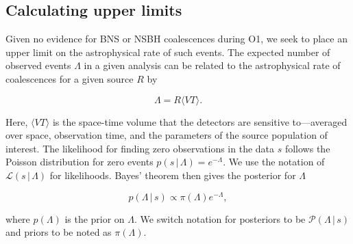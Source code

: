 \subsection{Calculating upper limits}
\label{ssec:upper_limits}

Given no evidence for \ac{BNS} or \ac{NSBH} coalescences during \ac{O1}, we seek to place an upper limit
on the astrophysical rate of such events.
The expected number of observed events $\Lambda$ in a given analysis can be
related to the astrophysical rate of coalescences for a given source $R$ by
%
\begin{linenomath*}
\begin{equation}
    \Lambda = R { \langle VT \rangle}.
\end{equation}
\end{linenomath*}
%
Here, $\langle VT \rangle$ is the space-time volume that the detectors are sensitive
to---averaged over space, observation time, and the parameters of the source population
of interest. The likelihood for finding zero observations in the data $s$ follows the
Poisson distribution for zero events $p (s \, | \, \Lambda) = e^{-\Lambda}$. We use
the notation of $\mathcal{L} (s \, | \, \Lambda)$ for likelihoods. Bayes' theorem then
gives the posterior for $\Lambda$
%
\begin{linenomath*}
\begin{equation}
    p (\Lambda \, | \, s) \propto \pi (\Lambda) e^{-\Lambda},
\label{eq:lambdapost}
\end{equation}
\end{linenomath*}
%
where $p(\Lambda)$ is the prior on $\Lambda$. We switch notation for posteriors
to be $\mathcal{P}(\Lambda \, | \, s)$ and priors to be noted as $\pi(\Lambda)$.

